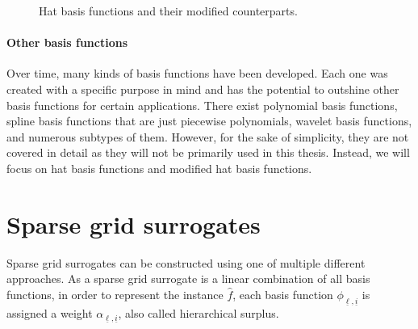 \documentclass[
  a4paper,  %
  twoside,  %
  bibliography=totoc,
  headsepline,
  cleardoublepage=empty,
  parskip=half,
  draft=false
]{scrbook}
\begin{document}
\begin{mdframed}[style=style]
\begin{figure}[H]
\begin{subfigure}{.5\textwidth}
  \label{fig:basis_hat_mod}
\vspace{1.5mm}
\end{subfigure}
  \delimit
\caption{Hat basis functions and their modified counterparts.}
  \label{fig:basis_hat}
\end{figure}
\end{mdframed}

\paragraph{Other basis functions}
Over time, many kinds of basis functions have been developed.
Each one was created with a specific purpose in mind and has the potential to outshine other basis functions for certain applications.
There exist polynomial basis functions, spline basis functions that are just piecewise polynomials, wavelet basis functions, and numerous subtypes of them.
However, for the sake of simplicity, they are not covered in detail as they will not be primarily used in this thesis.
Instead, we will focus on hat basis functions and modified hat basis functions.

\section{Sparse grid surrogates}
\label{sec:gsc}

Sparse grid surrogates can be constructed using one of multiple different approaches.
As a sparse grid surrogate is a linear combination of all basis functions, in order to represent the instance $\hat{f}$, each basis function $\phi_{\underline{\ell},\underline{i}}$ is assigned a weight $\alpha_{\underline{\ell},\underline{i}}$, also called hierarchical surplus.
\end{document}
